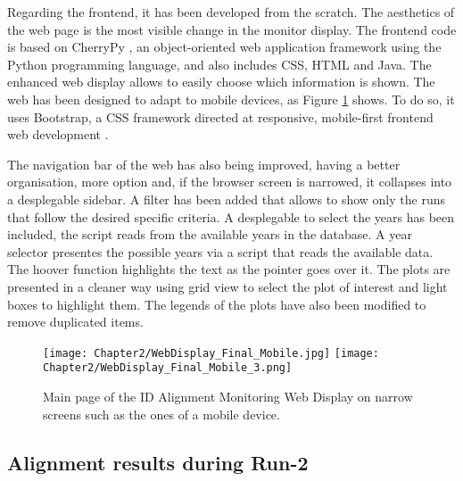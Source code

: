 Regarding the frontend, it has been developed from the scratch. 
The aesthetics of the web page is the most visible change in the monitor display.
The frontend code is based on CherryPy \cite{CherryPyDoc}, an object-oriented web application framework using 
the Python programming language, and also includes CSS, HTML and Java.
The enhanced web display allows to easily choose which information is shown.  
The web has been designed to adapt to mobile devices, 
as Figure \ref{fig:Chap2:Alignment:WebDisplay_mobile} shows. To do so, it uses Bootstrap,
a CSS framework directed at responsive, mobile-first frontend web development .


The navigation bar of the web has also being improved, having a better organisation, more 
option and, if the browser screen is narrowed, it collapses into a desplegable sidebar.
A filter has been added that allows to show only the runs that follow the desired specific criteria.
A desplegable to select the years has been included, the script reads from the available 
years in the database. A year selector presentes the possible years via a script that
reads the available data. The hoover function highlights the text as the pointer goes
over it. The plots are presented in a cleaner way using grid view to select the plot of interest
and light boxes to highlight them. The legends of the plots have also been modified
to remove duplicated items.




\begin{figure}[htp]
  \texttt{[image: Chapter2/WebDisplay\_Final\_Mobile.jpg]} \hspace{0.3 cm}
  \texttt{[image: Chapter2/WebDisplay\_Final\_Mobile\_3.png]}
\caption{Main page of the ID Alignment Monitoring Web Display on narrow screens 
such as the ones of a mobile device.}
\label{fig:Chap2:Alignment:WebDisplay_mobile}
\end{figure}



\subsection{Alignment results during Run-2}




